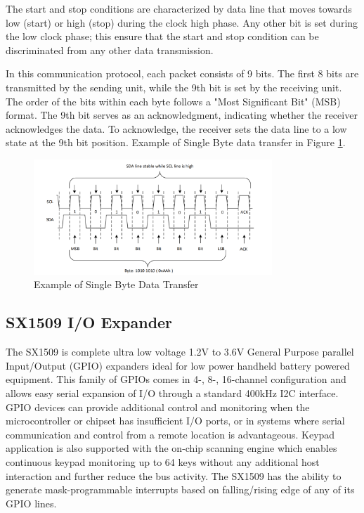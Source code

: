 \documentclass[english]{article}
\begin{document}
The start and stop conditions are characterized by data line that
moves towards low (start) or high (stop) during the clock high phase.
Any other bit is set during the low clock phase; this ensure that the
start and stop condition can be discriminated from any other data
transmission.\newline

In this communication protocol, each packet consists of 9 bits. 
The first 8 bits are transmitted by the sending unit, while the 9th bit is set by the receiving unit. 
The order of the bits within each byte follows a "Most Significant Bit" (MSB) format. 
The 9th bit serves as an acknowledgment, indicating whether the receiver acknowledges the data. 
To acknowledge, the receiver sets the data line to a low state at the 9th bit position.
Example of Single Byte data transfer in Figure \ref{fig:Data}.
\begin{figure}[!h]
	\centering
	\includegraphics[width=0.80\textwidth,]{figures/Single_byte.png}
	\caption{Example of Single Byte Data Transfer}
	\label{fig:Data}
\end{figure}

\subsection{SX1509 I/O Expander}
The SX1509 is complete ultra
low voltage 1.2V to 3.6V General Purpose parallel
Input/Output (GPIO) expanders ideal for low power
handheld battery powered equipment. This family of
GPIOs comes in 4-, 8-, 16-channel configuration and
allows easy serial expansion of I/O through a
standard 400kHz I2C interface. GPIO devices can
provide additional control and monitoring when the
microcontroller or chipset has insufficient I/O ports, or
in systems where serial communication and control
from a remote location is advantageous. Keypad application is also supported with
the on-chip scanning engine which enables
continuous keypad monitoring up to 64 keys without
any additional host interaction and further reduce the
bus activity. The SX1509 has the ability to
generate mask-programmable interrupts based on
falling/rising edge of any of its GPIO lines. \newline
\end{document}
